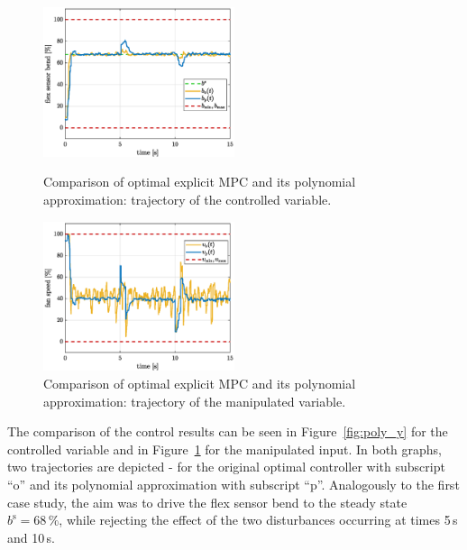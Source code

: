\documentclass[letterpaper, 10 pt, conference]{ieeeconf}
\begin{document}
	\begin{figure}[bp!]
		\begin{center}
			\includegraphics[width=0.5\textwidth]{images/poly_b.eps}
			\caption{Comparison of optimal explicit MPC and its polynomial approximation: trajectory of the controlled variable.}
			\label{fig:poly_y}
		\end{center}
		\begin{center}
			\includegraphics[width=0.5\textwidth]{images/poly_v.eps}
			\caption{Comparison of optimal explicit MPC and its polynomial approximation: trajectory of the manipulated variable.}
			\label{fig:poly_u}
		\end{center}
	\end{figure}
	
	
	The comparison of the control results can be seen in Figure~\ref{fig:poly_y} for the controlled variable and in Figure~\ref{fig:poly_u} for the manipulated input. In both graphs, two trajectories are depicted - for the original optimal controller with subscript ``o'' and its polynomial approximation with subscript ``p''. Analogously to the first case study, the aim was to drive the flex sensor bend to the steady state $ b^\mathrm{s} = 68\,\%$, while rejecting the effect of the two disturbances occurring at times 5\,s and 10\,s.
	
\end{document}
